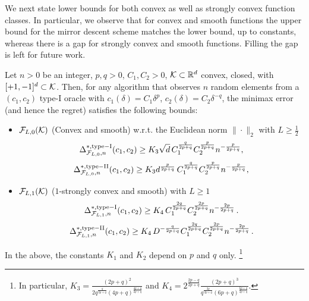We next state lower bounds for both convex as well as strongly convex function classes. In particular, we observe that for convex and smooth functions the upper bound for the mirror descent scheme matches the lower bound, up to constants, whereas there is a gap for strongly convex and smooth functions.
Filling the gap is left for future work.
\begin{theorem}
\label{thm:lb-convex}
Let $n>0$ be an integer, $p,q>0$, $C_1,C_2>0$, 
$\mathcal{K}\subset \mathbb{R}^d$ convex, closed, with  $[+1,-1]^d\subset \mathcal{K}$.
Then, for any algorithm that observes $n$ random elements from a $(c_1,c_2)$ type-I oracle 
 with $c_1(\delta) = C_1 \delta^p$, $c_2(\delta) = C_2 \delta^{-q}$,
 the minimax error (and hence the regret) satisfies the following bounds:
 \begin{itemize}
 \item
${\mathcal{F}_{L,0}(\mathcal{K})}$ (Convex and smooth) w.r.t. the Euclidean norm $\|\cdot\|_2$ with $L\ge \frac12$
\[
 \Delta_{\F_{L,0},n}^{*, \mathrm{type-I}}(c_1,c_2) \ge K_3\sqrt{d} \, C_1^{\frac{q}{2p+q}} C_2^{\frac{p}{2p+q}} n^{-\frac{p}{2p+q}}, %
\]
\[
 \Delta_{\F_{L,0},n}^{*, \mathrm{type-II}}(c_1,c_2) \ge K_3d^{\frac{p}{2p+q}} \, C_1^{\frac{q}{2p+q}} C_2^{\frac{p}{2p+q}} n^{-\frac{p}{2p+q}}, %
\]
\item
${\mathcal{F}_{L,1}(\mathcal{K})}$ ($1$-strongly convex and smooth) with $L\ge 1$
\[
\Delta_{\F_{L,1}, n}^{*, \mathrm{type-I}}(c_1,c_2) \ge K_4 \,  C_1^{\frac{2q}{2p+q}} C_2^{\frac{2p}{2p+q}} n^{-\frac{2p}{2p+q}}\,. %
\]
\[
\Delta_{\F_{L,1}, n}^{*, \mathrm{type-II}}(c_1,c_2) \ge K_4 \,  D^{-\frac{q}{2p+q}}C_1^{\frac{2q}{2p+q}} C_2^{\frac{2p}{2p+q}} n^{-\frac{2p}{2p+q}}\,. %
\]
\end{itemize}
In the above,
the constants $K_1$ and $K_2$ depend on $p$ and $q$ only.%
\footnote{
In particular,
$K_3= \frac{\left(2p+q\right)^2}{2q^{\frac{q}{2p+q}}\left(4p+q\right)^{\frac{4p+q}{2p+q}}}$
and
$K_4= 2^{\frac{2p-q}{2p+q}} \frac{(2p+q)^3}{q^{\frac{2q}{2p+q}}(6p+q)^{\frac{6p+q}{2p+q}}}$.}
\end{theorem}
